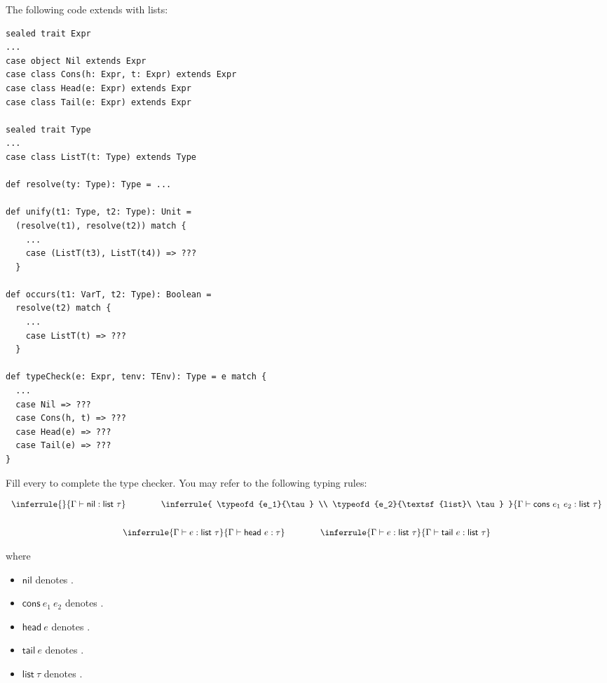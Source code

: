\begin{exercise}

The following code extends \lang with lists:
\begin{verbatim}
sealed trait Expr
...
case object Nil extends Expr
case class Cons(h: Expr, t: Expr) extends Expr
case class Head(e: Expr) extends Expr
case class Tail(e: Expr) extends Expr

sealed trait Type
...
case class ListT(t: Type) extends Type

def resolve(ty: Type): Type = ...

def unify(t1: Type, t2: Type): Unit =
  (resolve(t1), resolve(t2)) match {
    ...
    case (ListT(t3), ListT(t4)) => ???
  }

def occurs(t1: VarT, t2: Type): Boolean =
  resolve(t2) match {
    ...
    case ListT(t) => ???
  }

def typeCheck(e: Expr, tenv: TEnv): Type = e match {
  ...
  case Nil => ???
  case Cons(h, t) => ???
  case Head(e) => ???
  case Tail(e) => ???
}
\end{verbatim}

Fill every  to complete the type checker.
You may refer to the following typing rules:

\[
\begin{array}{c}
  \inferrule
  {}
  { \typeofd{\textsf{nil}}{\textsf{list}\ \tau} }
  \qquad\qquad
  \inferrule
  { \typeofd{e_1}{\tau} \\ \typeofd{e_2}{\textsf{list}\ \tau} }
  { \typeofd{\textsf{cons}\ e_1\ e_2}{\textsf{list}\ \tau} }
  \\[2em]
  \inferrule
  { \typeofd{e}{\textsf{list}\ \tau} }
  { \typeofd{\textsf{head}\ e}{\tau} }
  \qquad\qquad
  \inferrule
  { \typeofd{e}{\textsf{list}\ \tau} }
  { \typeofd{\textsf{tail}\ e}{\textsf{list}\ \tau} }
\end{array}
\]

where

\begin{itemize}
  \item $\textsf{nil}$ denotes .
  \item $\textsf{cons}\ e_1\ e_2$ denotes .
  \item $\textsf{head}\ e$ denotes .
  \item $\textsf{tail}\ e$ denotes .
  \item $\textsf{list}\ \tau$ denotes .
\end{itemize}

\end{exercise}

